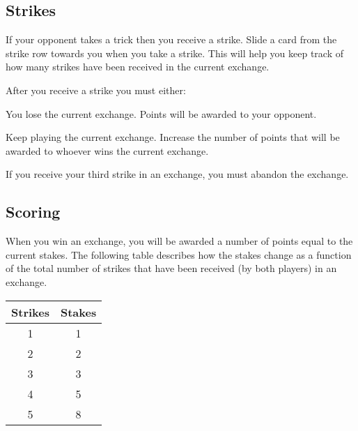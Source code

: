 \documentclass[a6paper, parskip=half, DIV=14, 10pt]{scrartcl}
\newcommand{\card}[1]{{\setmainfont{Roboto Slab} #1}}
\begin{document}
%

\newpage

\subsection*{Strikes}
If your opponent takes a trick then you receive a strike. Slide a card from the strike row towards you when you take a strike. This will help you keep track of how many strikes have been received in the current exchange.


After you receive a strike you must either:
\begin{description}[leftmargin=0pt, labelsep=\widthof{\ }]
	\item[Abandon the Exchange \textendash] You lose the current exchange. Points will be awarded to your opponent.
	\item[Raise the Stakes \textendash] Keep playing the current exchange. Increase the number of points that will be awarded to whoever wins the current exchange.
\end{description}
If you receive your third strike in an exchange, you must abandon the exchange.

\newpage

\subsection*{Scoring}
When you win an exchange, you will be awarded a number of points equal to the current stakes. The following table describes how the stakes change as a function of the total number of strikes that have been received (by both players) in an exchange.

{
\setmainfont{Roboto Slab}
\begin{table}[h]
\centering
\begin{tabular}{cc} \toprule
\textbf{Strikes} & \textbf{Stakes} \\ \midrule
1 & 1\\
2 & 2\\
3 & 3\\
4 & 5\\
5 & 8 \\ \bottomrule
\end{tabular}
\end{table}
}
\end{document}
